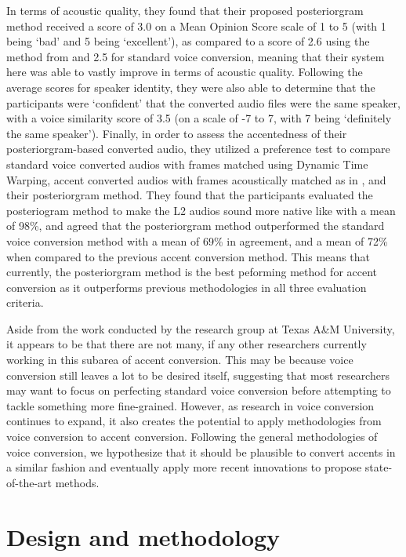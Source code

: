 \documentclass
[
    a4paper,
    twoside,
    12pt,
]
{report}
\begin{document}
In terms of acoustic quality, they found that their proposed
posteriorgram method received a score of 3.0 on a Mean Opinion Score
scale of 1 to 5 (with 1 being `bad' and 5 being `excellent'), as
compared to a score of 2.6 using the method from \textcite{aryal2014}
and 2.5 for standard voice conversion, meaning that their system here
was able to vastly improve in terms of acoustic quality. Following the
average scores for speaker identity, they were also able to determine
that the participants were `confident' that the converted audio files
were the same speaker, with a voice similarity score of 3.5 (on a scale
of -7 to 7, with 7 being `definitely the same speaker'). Finally, in
order to assess the accentedness of their posteriorgram-based converted
audio, they utilized a preference test to compare standard voice
converted audios with frames matched using Dynamic Time Warping, accent
converted audios with frames acoustically matched as in
\textcite{aryal2014}, and their posteriorgram method. They found that
the participants evaluated the posteriogram method to make the L2 audios
sound more native like with a mean of 98\%, and agreed that the
posteriorgram method outperformed the standard voice conversion method
with a mean of 69\% in agreement, and a mean of 72\% when compared to
the previous accent conversion method. This means that currently, the
posteriorgram method is the best peforming method for accent conversion
as it outperforms previous methodologies in all three evaluation
criteria.

Aside from the work conducted by the research group at Texas A\&M
University, it appears to be that there are not many, if any other
researchers currently working in this subarea of accent conversion. This
may be because voice conversion still leaves a lot to be desired itself,
suggesting that most researchers may want to focus on perfecting
standard voice conversion before attempting to tackle something more
fine-grained. However, as research in voice conversion continues to
expand, it also creates the potential to apply methodologies from voice
conversion to accent conversion. Following the general methodologies of
voice conversion, we hypothesize that it should be plausible to convert
accents in a similar fashion and eventually apply more recent
innovations to propose state-of-the-art methods.
\cleardoublepage
\chapter{Design and methodology}
\end{document}
